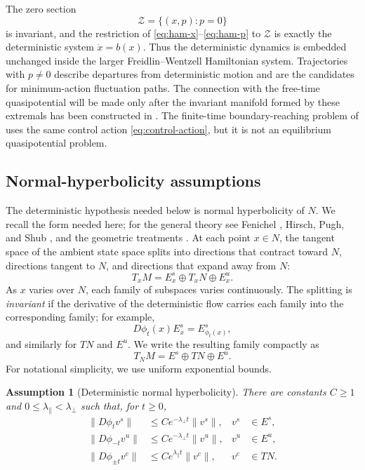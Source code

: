 \documentclass[11pt]{article}
\newtheorem{assumption}[theorem]{Assumption}
\theoremstyle{definition}
\theoremstyle{remark}
\newcommand{\Z}{\mathcal{Z}}
\newcommand{\phit}{\phi_t}
\begin{document}
The zero section
\begin{equation}
\Z=\{(x,p):p=0\}
\end{equation}
is invariant, and the restriction of \eqref{eq:ham-x}--\eqref{eq:ham-p} to $\Z$ is exactly the deterministic system $\dot x=b(x)$.  Thus the deterministic dynamics is embedded unchanged inside the larger Freidlin--Wentzell Hamiltonian system.  Trajectories with $p\ne0$ describe departures from deterministic motion and are the candidates for minimum-action fluctuation paths.  The connection with the free-time quasipotential will be made only after the invariant manifold formed by these extremals has been constructed in .  The finite-time boundary-reaching problem of  uses the same control action \eqref{eq:control-action}, but it is not an equilibrium quasipotential problem.

\subsection{Normal-hyperbolicity assumptions}

The deterministic hypothesis needed below is normal hyperbolicity of $N$.  We recall the form needed here; for the general theory see Fenichel \cite{Fenichel1971,Fenichel1974}, Hirsch, Pugh, and Shub \cite{HirschPughShub1977}, and the geometric treatments \cite{Wiggins1994,Eldering2013}.  At each point $x\in N$, the tangent space of the ambient state space splits into directions that contract toward $N$, directions tangent to $N$, and directions that expand away from $N$:
\begin{equation}
T_xM=E_x^s\oplus T_xN\oplus E_x^u.
\end{equation}
As $x$ varies over $N$, each family of subspaces varies continuously.  The splitting is \emph{invariant} if the derivative of the deterministic flow carries each family into the corresponding family; for example,
\begin{equation}
D\phi_t(x)E_x^s=E_{\phi_t(x)}^s,
\end{equation}
and similarly for $TN$ and $E^u$.  We write the resulting family compactly as
\begin{equation}
T_NM=E^s\oplus TN\oplus E^u.
\label{eq:det-splitting}
\end{equation}
For notational simplicity, we use uniform exponential bounds.

\begin{assumption}[Deterministic normal hyperbolicity]
\label{ass:NHIM}
There are constants $C\ge1$ and $0\le\lambda_{\parallel}<\lambda_{\perp}$ such that, for $t\ge0$,
\begin{align}
\|D\phit v^s\|&\le Ce^{-\lambda_{\perp} t}\|v^s\|,
&v^s&\in E^s,
\label{eq:rate-s}\\
\|D\phi_{-t}v^u\|&\le Ce^{-\lambda_{\perp} t}\|v^u\|,
&v^u&\in E^u,
\label{eq:rate-u}\\
\|D\phi_{\pm t}v^c\|&\le Ce^{\lambda_{\parallel} t}\|v^c\|,
&v^c&\in TN.
\label{eq:rate-c}
\end{align}
\end{assumption}
\end{document}
